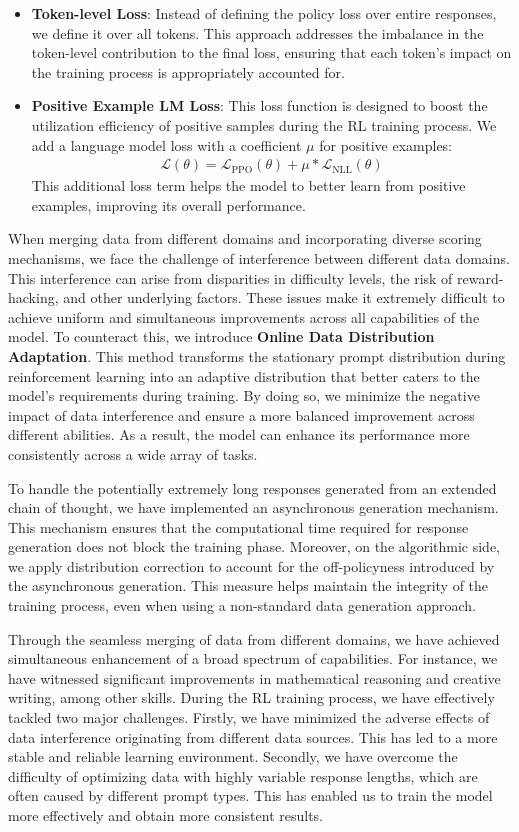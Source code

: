 \begin{itemize}
    \item \textbf{Token-level Loss}: Instead of defining the policy loss over entire responses, we define it over all tokens. This approach addresses the imbalance in the token-level contribution to the final loss, ensuring that each token's impact on the training process is appropriately accounted for.
    \item \textbf{Positive Example LM Loss}: This loss function is designed to boost the utilization efficiency of positive samples during the RL training process. We add a language model loss with a coefficient $\mu$ for positive examples:
    \begin{align}
    \mathcal{L}(\theta) = \mathcal{L}_{\text{PPO}}(\theta)+\mu * \mathcal{L}_{\text{NLL}}(\theta)
    \end{align}
This additional loss term helps the model to better learn from positive examples, improving its overall performance.
\end{itemize}

When merging data from different domains and incorporating diverse scoring mechanisms, we face the challenge of interference between different data domains. This interference can arise from disparities in difficulty levels, the risk of reward-hacking, and other underlying factors. These issues make it extremely difficult to achieve uniform and simultaneous improvements across all capabilities of the model. To counteract this, we introduce \textbf{Online Data Distribution Adaptation}. This method transforms the stationary prompt distribution during reinforcement learning into an adaptive distribution that better caters to the model's requirements during training. By doing so, we minimize the negative impact of data interference and ensure a more balanced improvement across different abilities. As a result, the model can enhance its performance more consistently across a wide array of tasks.

To handle the potentially extremely long responses generated from an extended chain of thought, we have implemented an asynchronous generation mechanism. This mechanism ensures that the computational time required for response generation does not block the training phase. Moreover, on the algorithmic side, we apply distribution correction to account for the off-policyness introduced by the asynchronous generation. This measure helps maintain the integrity of the training process, even when using a non-standard data generation approach. 


 Through the seamless merging of data from different domains, we have achieved simultaneous enhancement of a broad spectrum of capabilities. For instance, we have witnessed significant improvements in mathematical reasoning and creative writing, among other skills. During the RL training process, we have effectively tackled two major challenges. Firstly, we have minimized the adverse effects of data interference originating from different data sources. This has led to a more stable and reliable learning environment. Secondly, we have overcome the difficulty of optimizing data with highly variable response lengths, which are often caused by different prompt types. This has enabled us to train the model more effectively and obtain more consistent results.


